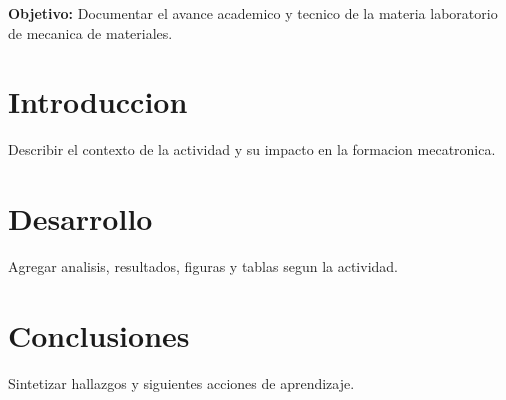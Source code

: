 \documentclass[spanish,letterpaper,oneside]{article}
\begin{document}
\templatePortrait
\templatePagecfg
\onehalfspacing

\begin{abstractd}
\textbf{Objetivo:} Documentar el avance academico y tecnico de la materia laboratorio de mecanica de materiales.
\end{abstractd}

\templateIndex
\templateFinalcfg

\section{Introduccion}
Describir el contexto de la actividad y su impacto en la formacion mecatronica.

\section{Desarrollo}
Agregar analisis, resultados, figuras y tablas segun la actividad.

\section{Conclusiones}
Sintetizar hallazgos y siguientes acciones de aprendizaje.



\end{document}
